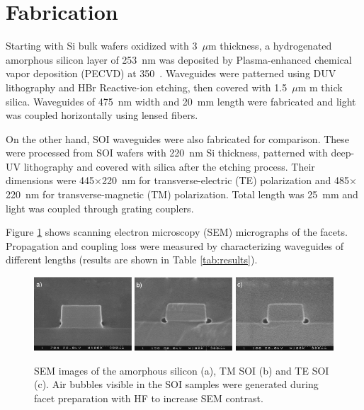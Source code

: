 \documentclass[10pt,letterpaper]{article}
\begin{document}
\section{Fabrication}
Starting with Si bulk wafers oxidized with 3~$\mu \mathrm{m}$ thickness, a hydrogenated amorphous silicon layer of 253~nm was deposited by Plasma-enhanced chemical vapor deposition (PECVD) at 350~\textcelsius. Waveguides were patterned using DUV lithography and HBr Reactive-ion etching, then covered with 1.5~$\mu \mathrm{m}$ m thick silica. Waveguides of 475~nm width and 20~mm length were fabricated and light was coupled horizontally using lensed fibers.

On the other hand, SOI waveguides were also fabricated for comparison. These were processed from SOI wafers with 220~nm Si thickness, patterned with deep-UV lithography and covered with silica after the etching process. Their dimensions were  445$\times$220~nm  for transverse-electric (TE) polarization and 485$\times$220~nm for transverse-magnetic (TM) polarization. Total length was 25~mm and light was coupled through grating couplers.

Figure \ref{fig:sem} shows scanning electron microscopy (SEM) micrographs of the facets. Propagation and coupling loss were measured by characterizing waveguides of different lengths (results are shown in Table \ref{tab:results}). 



\begin{figure}[htb]
    \centering
    \includegraphics[width=0.325\textwidth]{p13_4}
    \includegraphics[width=0.325\textwidth]{semTM_4}
    \includegraphics[width=0.325\textwidth]{semTE_2}
    \caption{SEM images of the amorphous silicon (a), TM SOI (b) and TE SOI (c). Air bubbles visible in the SOI samples were generated during facet preparation with HF to increase SEM contrast.}
    \label{fig:sem}
\end{figure}
\end{document}
